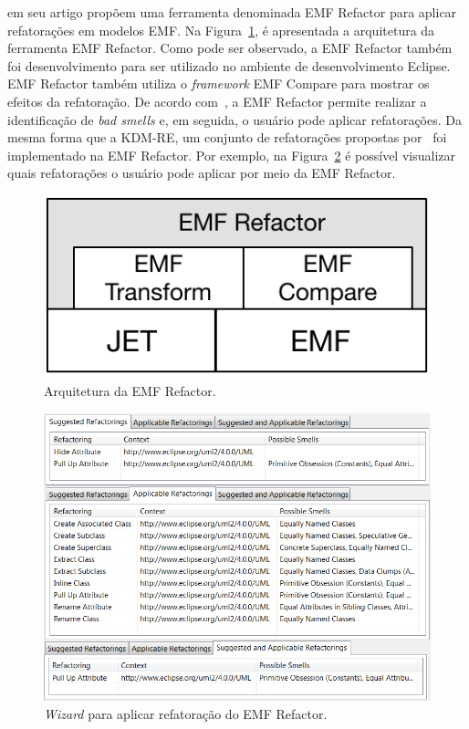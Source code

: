  em seu artigo propõem uma ferramenta denominada EMF Refactor para aplicar refatorações em modelos EMF. Na Figura~\ref{fig:arquitetura_emf_refactor}, é apresentada a arquitetura da ferramenta EMF Refactor. Como pode ser observado, a EMF Refactor também foi desenvolvimento para ser utilizado no ambiente de desenvolvimento Eclipse. EMF Refactor também utiliza o \textit{framework} EMF Compare para mostrar os efeitos da refatoração. De acordo com~, a EMF Refactor permite realizar a identificação de \textit{bad smells} e, em seguida, o usuário pode aplicar refatorações. Da mesma forma que a KDM-RE, um conjunto de refatorações propostas por~ foi implementado na EMF Refactor. Por exemplo, na Figura~\ref{fig:wizard_emfCOmpare} é possível visualizar quais refatorações o usuário pode aplicar por meio da EMF Refactor. 

\begin{figure}[h]
	\centering
	\caption{Arquitetura da EMF Refactor.}
	\label{fig:arquitetura_emf_refactor}
	\includegraphics[scale=0.9]{images/EMFRefactorArchitecture}
\end{figure}


\begin{figure}[h]
	\centering
	\caption{\textit{Wizard} para aplicar refatoração do EMF Refactor.}
	\label{fig:wizard_emfCOmpare}
	\includegraphics[scale=0.7]{images/EMFRefactorWizard}
\end{figure}

